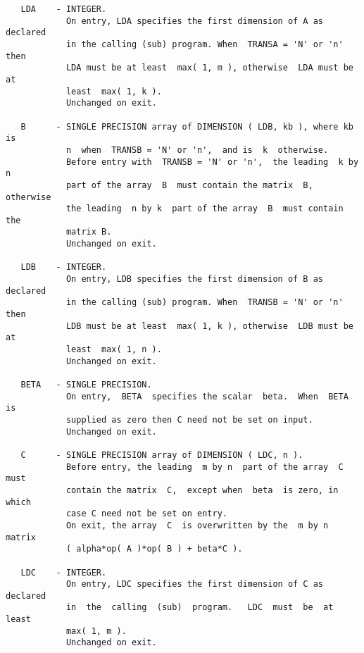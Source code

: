 \documentclass[10pt]{book}
\begin{document}
\begin{verbatim}
   LDA    - INTEGER.
            On entry, LDA specifies the first dimension of A as declared
            in the calling (sub) program. When  TRANSA = 'N' or 'n' then
            LDA must be at least  max( 1, m ), otherwise  LDA must be at
            least  max( 1, k ).
            Unchanged on exit.
 
   B      - SINGLE PRECISION array of DIMENSION ( LDB, kb ), where kb is
            n  when  TRANSB = 'N' or 'n',  and is  k  otherwise.
            Before entry with  TRANSB = 'N' or 'n',  the leading  k by n
            part of the array  B  must contain the matrix  B,  otherwise
            the leading  n by k  part of the array  B  must contain  the
            matrix B.
            Unchanged on exit.
 
   LDB    - INTEGER.
            On entry, LDB specifies the first dimension of B as declared
            in the calling (sub) program. When  TRANSB = 'N' or 'n' then
            LDB must be at least  max( 1, k ), otherwise  LDB must be at
            least  max( 1, n ).
            Unchanged on exit.
 
   BETA   - SINGLE PRECISION.
            On entry,  BETA  specifies the scalar  beta.  When  BETA  is
            supplied as zero then C need not be set on input.
            Unchanged on exit.
 
   C      - SINGLE PRECISION array of DIMENSION ( LDC, n ).
            Before entry, the leading  m by n  part of the array  C must
            contain the matrix  C,  except when  beta  is zero, in which
            case C need not be set on entry.
            On exit, the array  C  is overwritten by the  m by n  matrix
            ( alpha*op( A )*op( B ) + beta*C ).
 
   LDC    - INTEGER.
            On entry, LDC specifies the first dimension of C as declared
            in  the  calling  (sub)  program.   LDC  must  be  at  least
            max( 1, m ).
            Unchanged on exit.

\end{verbatim}

\newpage
\end{document}
